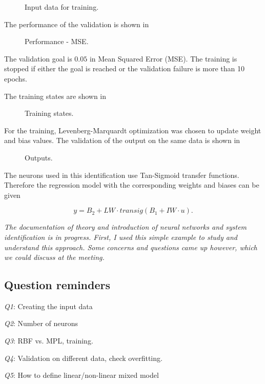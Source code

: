 \begin{figure}[H]
\centering
 
\caption{Input data for training.}
\label{fig:inputs}
\end{figure}

The performance of the validation is shown in 

\begin{figure}[H]
\centering
 
\caption{Performance - MSE.}
\label{fig:performance}
\end{figure}

The validation goal is $0.05$ in Mean Squared Error (MSE). The training is stopped if either the goal is reached or the validation failure is more than 10 epochs. 

The training states are shown in 

\begin{figure}[H]
\centering
 
\caption{Training states.}
\label{fig:training}
\end{figure}

For the training, Levenberg-Marquardt optimization was chosen to update weight and bias values. The validation of the output on the same data is shown in 

\begin{figure}[H]
\centering
 
\caption{Outputs.}
\label{fig:output}
\end{figure}

The neurons used in this identification use Tan-Sigmoid transfer functions. Therefore the regression model with the corresponding weights and biases can be given 

\begin{equation}
\label{eq10}
y = B_2 + LW \cdot transig(B_1 + IW \cdot u).
\end{equation}

\emph{The documentation of theory and introduction of neural networks and system identification is in progress. First, I used this simple example to study and understand this approach. Some concerns and questions came up however, which we could discuss at the meeting.}

\subsection{Question reminders}
\emph{Q1}: Creating the input data

\emph{Q2}: Number of neurons

\emph{Q3}: RBF vs. MPL, training. 

\emph{Q4}: Validation on different data, check overfitting. 

\emph{Q5}: How to define linear/non-linear mixed model

